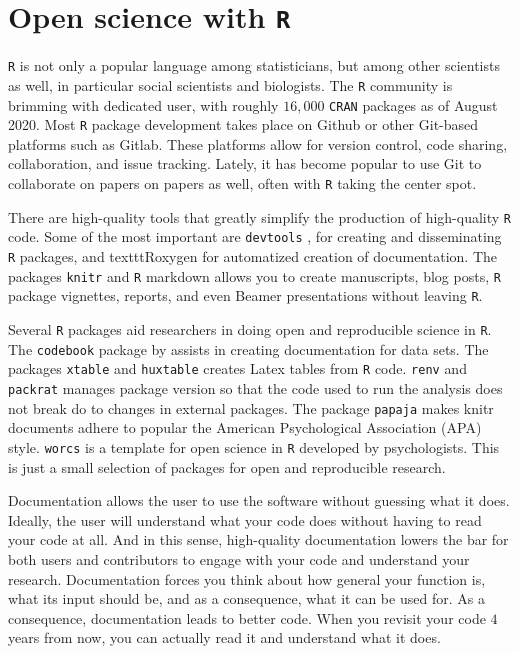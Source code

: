 \section{Open science with \texttt{R}}

\texttt{R} is not only a popular language among statisticians, but among other scientists as well, in particular social scientists and biologists. The \texttt{R} community is brimming with dedicated user, with roughly $16,000$ \texttt{CRAN} packages as of August 2020. Most \texttt{R} package development takes place on Github or other Git-based platforms such as Gitlab. These platforms allow for version control, code sharing, collaboration, and issue tracking. Lately, it has become popular to use Git to collaborate on papers on papers as well, often with \texttt{R} taking the center spot.

There are high-quality tools that greatly simplify the production of high-quality \texttt{R} code. Some of the most important are \texttt{devtools} \parencite{devtools}, for creating and disseminating \texttt{R} packages, and texttt{Roxygen} \parencite{roxygen2} for automatized creation of documentation. The packages \texttt{knitr} \parencite{Xie2014} and \texttt{R} markdown allows you to create manuscripts, blog posts, \texttt{R} package vignettes, reports, and even Beamer presentations without leaving \texttt{R}.

Several \texttt{R} packages aid researchers in doing open and reproducible science in \texttt{R}. The \texttt{codebook} package by \textcite{Arslan2019-tg} assists in creating documentation for data sets. The packages \texttt{xtable} \parencite{xtable} and \texttt{huxtable} \parencite{huxtable} creates Latex tables from \texttt{R} code. \texttt{renv} \parencite{renv} and \texttt{packrat} \parencite{packrat} manages package version so that the code used to run the analysis does not break do to changes in external packages. The package \texttt{papaja} \parencite{papaja} makes knitr documents adhere to popular the American Psychological Association (APA) style. \texttt{worcs} \parencite{Van_Lissa2020-sb} is a template for open science in \texttt{R} developed by psychologists. This is just a small selection of packages for open and reproducible research.

Documentation allows the user to use the software without guessing what it does. Ideally, the user will understand what your code does without having to read your code at all. And in this sense, high-quality documentation lowers the bar for both users and contributors to engage with your code and understand your research. Documentation forces you think about how general your function is, what its input should be, and as a consequence, what it can be used for. As a consequence, documentation leads to better code. When you revisit your code $4$ years from now, you can actually read it and understand what it does. 

